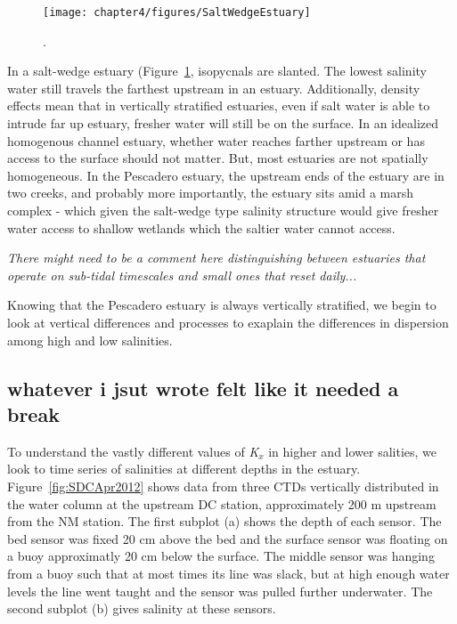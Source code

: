\begin{figure}[h]
\centering
	\texttt{[image: chapter4/figures/SaltWedgeEstuary]}
	\caption{.} \label{fig:SaltWedgeEstuary}
\end{figure}

In a salt-wedge estuary (Figure~\ref{fig:SaltWedgeEstuary}, isopycnals are slanted. The lowest salinity water still travels the farthest upstream in an estuary. Additionally, density effects mean that in vertically stratified estuaries, even if salt water is able to intrude far up estuary, fresher water will still be on the surface. In an idealized homogenous channel estuary, whether water reaches farther upstream or has access to the surface should not matter. But, most estuaries are not spatially homogeneous. In the Pescadero estuary, the upstream ends of the estuary are in two creeks, and probably more importantly, the estuary sits amid a marsh complex - which given the salt-wedge type salinity structure would give fresher water access to shallow wetlands which the saltier water cannot access. 

\emph{There might need to be a comment here distinguishing between estuaries that operate on sub-tidal timescales and small ones that reset daily...}

Knowing that the Pescadero estuary is always vertically stratified, we begin to look at vertical differences and processes to exaplain the differences in dispersion among high and low salinities. 

\subsection{whatever i jsut wrote felt like it needed a break}

To understand the vastly different values of \emph{K$_x$} in higher and lower salities, we look to time series of salinities at different depths in the estuary. Figure~\ref{fig:SDCApr2012} shows data from three CTDs vertically distributed in the water column at the upstream DC station, approximately 200 m upstream from the NM station. The first subplot (a) shows the depth of each sensor. The bed sensor was fixed 20 cm above the bed and the surface sensor was floating on a buoy approximatly 20 cm below the surface. The middle sensor was hanging from a buoy such that at most times its line was slack, but at high enough water levels the line went taught and the sensor was pulled further underwater. The second subplot (b) gives salinity at these sensors.

